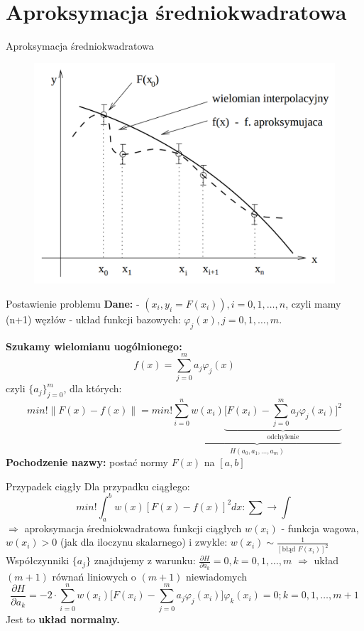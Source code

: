 \section{Aproksymacja średniokwadratowa}
\begin{frame}{Aproksymacja średniokwadratowa}
  	\begin{figure}
	\includegraphics[height=0.8\textheight]{img/5/aproksymacja_sredniokwadratowa}
	\end{figure}
\end{frame}
\begin{frame}{Postawienie problemu}
	\textbf{Dane:}\newline
    - ${(x_i,y_i = F(x_i)),i=0,1,\ldots,n}$, czyli mamy (n+1) węzłów \newline
    - układ funkcji bazowych: $\varphi_j(x),j=0,1,\ldots,m$.\newline\par
    \textbf{Szukamy wielomianu uogólnionego:}
    $$f(x) = \sum_{j = 0}^{m} a_j \varphi_j(x)$$
    czyli $\{{a_j}\}_{j=0}^m$, dla których:
    $$min!\parallel F(x) - f(x) \parallel = min!\underbrace{ \sum_{i=0}^{n}w(x_i)\underbrace{\bigg[F(x_i)-\sum_{j=0}^{m}a_j\varphi_j(x_i)\bigg]^2}_\text{odchylenie}}_{H(a_0,a_1,\ldots,a_m)}$$
    \textbf{Pochodzenie nazwy:} postać normy $F(x)$ na $[a,b]$
\end{frame}
\begin{frame}{Przypadek ciągły}
	Dla przypadku ciągłego:
    $$min!\int_a^bw(x)[F(x)-f(x)]^2dx : \sum \rightarrow \int$$
    $\Rightarrow$ aproksymacja średniokwadratowa funkcji ciągłych\newline
    $w(x_i)$ - funkcja wagowa, $w(x_i)>0$ (jak dla iloczynu skalarnego) i zwykle: $w(x_i) \sim \frac{1}{[\text{błąd }F(x_i)]^2}$ \newline
    Współczynniki $\{a_j\}$ znajdujemy z warunku: $\frac{\partial H}{\partial a_k} = 0, k=0,1,\ldots,m$
    $\Rightarrow$ układ $(m+1)$ równań liniowych o $(m+1)$ niewiadomych
    $$\frac{\partial H}{\partial a_k} = -2 \cdot \sum_{i=0}^{n}w(x_i)\bigg[F(x_i)-\sum_{j=0}^{m}a_j\varphi_j(x_i)\bigg]\varphi_k(x_i)=0;k=0,1,\ldots,m+1$$
    Jest to \textbf{układ normalny.}
\end{frame}
